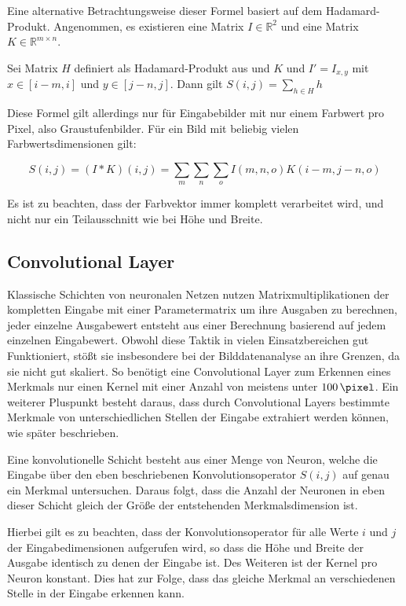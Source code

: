 Eine alternative Betrachtungsweise dieser Formel basiert auf dem Hadamard-Produkt. Angenommen, es existieren eine Matrix $I\in\mathbb{R}^{2}$ und eine Matrix $K\in\mathbb{R}^{m\times n}$.

Sei Matrix $H$ definiert als Hadamard-Produkt aus und $K$ und $I'=I_{x, y}$ mit $x\in[i-m,i]$ und $y\in[j-n,j]$.
Dann gilt $S(i,j)=\sum_{h\in H}h$

Diese Formel gilt allerdings nur für Eingabebilder mit nur einem Farbwert pro Pixel, also Graustufenbilder. Für ein Bild mit beliebig vielen Farbwertsdimensionen gilt:

\begin{equation}
S(i,j) = (I*K)(i,j) = \sum_{m}\sum_{n}\sum_{o}I(m,n,o)K(i-m,j-n,o)
\end{equation}

Es ist zu beachten, dass der Farbvektor immer komplett verarbeitet wird, und nicht nur ein Teilausschnitt wie bei Höhe und Breite.


\subsection{Convolutional Layer}
\label{ssec:convlayer}

Klassische Schichten von neuronalen Netzen nutzen Matrixmultiplikationen der kompletten Eingabe mit einer Parametermatrix um ihre Ausgaben zu berechnen, \dh jeder einzelne Ausgabewert entsteht aus einer Berechnung basierend auf jedem einzelnen Eingabewert. Obwohl diese Taktik in vielen Einsatzbereichen gut Funktioniert, stößt sie insbesondere bei der Bilddatenanalyse an ihre Grenzen, da sie nicht gut skaliert. \cite{cs231n} So benötigt eine Convolutional Layer zum Erkennen eines Merkmals nur einen Kernel mit einer Anzahl von meistens unter $\SI{100}{\pixel}$. \cite{deeplearning_16} Ein weiterer Pluspunkt besteht daraus, dass durch Convolutional Layers bestimmte Merkmale von unterschiedlichen Stellen der Eingabe extrahiert werden können, wie später beschrieben.

Eine konvolutionelle Schicht besteht aus einer Menge von Neuron, welche die Eingabe über den eben beschriebenen Konvolutionsoperator $S(i,j)$ auf genau ein Merkmal untersuchen. Daraus folgt, dass die Anzahl der Neuronen in eben dieser Schicht gleich der Größe der entstehenden Merkmalsdimension ist.

Hierbei gilt es zu beachten, dass der Konvolutionsoperator für alle Werte $i$ und $j$ der Eingabedimensionen aufgerufen wird, so dass die Höhe und Breite der Ausgabe identisch zu denen der Eingabe ist.
Des Weiteren ist der Kernel pro Neuron konstant. Dies hat \ua zur Folge, dass das gleiche Merkmal an verschiedenen Stelle in der Eingabe erkennen kann.

